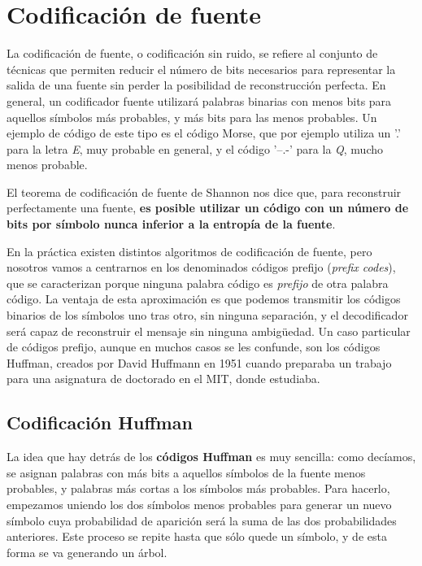 \documentclass[es,apuntes]{uah}
\begin{document}
\section{Codificación de fuente}

La codificación de fuente, o codificación sin ruido, se refiere al conjunto de técnicas que permiten reducir el número de bits necesarios para representar la salida de una fuente sin perder la posibilidad de reconstrucción perfecta. En general, un codificador fuente utilizará palabras binarias con menos bits para aquellos símbolos más probables, y más bits para las menos probables. Un ejemplo de código de este tipo es el código Morse, que por ejemplo utiliza un '.' para la letra \emph{E}, muy probable en general, y el código '--.-' para la \emph{Q}, mucho menos probable. 

El teorema de codificación de fuente de Shannon nos dice que, para reconstruir perfectamente una fuente, {\bf es posible utilizar un código con un número de bits por símbolo nunca inferior a la entropía de la fuente}.

En la práctica existen distintos algoritmos de codificación de fuente, pero nosotros vamos a centrarnos en los denominados códigos prefijo (\emph{prefix codes}), que se caracterizan porque ninguna palabra código es \emph{prefijo} de otra palabra código. La ventaja de esta aproximación es que podemos transmitir los códigos binarios de los símbolos uno tras otro, sin ninguna separación, y el decodificador será capaz de reconstruir el mensaje sin ninguna ambigüedad. Un caso particular de códigos prefijo, aunque en muchos casos se les confunde, son los códigos Huffman, creados por David Huffmann en 1951 cuando preparaba un trabajo para una asignatura de doctorado en el MIT, donde estudiaba.


\subsection{Codificación Huffman}

La idea que hay detrás de los {\bf códigos Huffman} es muy sencilla: como decíamos, se asignan palabras con más bits a aquellos símbolos de la fuente menos probables, y palabras más cortas a los símbolos más probables. Para hacerlo, empezamos uniendo los dos símbolos menos probables para generar un nuevo símbolo cuya probabilidad de aparición será la suma de las dos probabilidades anteriores. Este proceso se repite hasta que sólo quede un símbolo, y de esta forma se va generando un árbol. 
\end{document}
